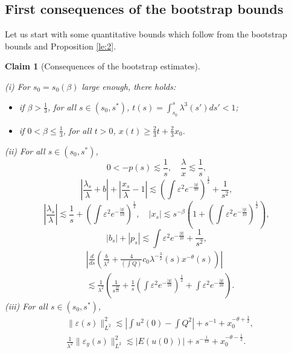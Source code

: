 \documentclass[11pt,a4paper,reqno]{amsart}
\newtheorem{claim}{Claim}
\theoremstyle{remark}
\numberwithin{equation}{section}
\newcommand{\be}{\begin{equation}}
\newcommand{\ee}{\end{equation}}
\def\e{\varepsilon}
\def\lsl{\frac{\lambda_s}{\lambda}}
\def\l{\lambda}
\def\lsl{\frac{\lambda_s}{\lambda}}
\def\xsl{\frac{x_s}{\lambda}}
\begin{document}

\subsection{First consequences of the bootstrap bounds} 


Let us start with some quantitative bounds which follow from the bootstrap bounds and Proposition \ref{le:2}.

\begin{claim}[Consequences of the bootstrap estimates]\label{le:3.1}
 
{\rm (i)} For $s_0=s_0(\beta)$ large enough, there holds:
\begin{itemize}
\item if $\beta>\frac 13$, for all $s\in (s_0,s^*)$, $t(s)= \int_{s_0}^{s} \l^3(s') ds'<1$;
\item if $0<\beta\leq \frac 13$, for all $t>0$, $x(t) \geq \frac 23 t + \frac 23 {x_0}$.
\end{itemize}
{\rm (ii)}
For all $s\in (s_0,s^*)$,
\be\label{BSp}
0< -p(s) \lesssim \frac 1 s,\quad \frac {\l}{x} \lesssim \frac 1 s,
\ee
\be\label{BSlsl}
\left|\lsl +b\right| + \left| \xsl - 1\right| \lesssim
\left(\int \varepsilon^2 {e^{-\frac{|y|}{10}}} \right)^{\frac 12} +  \frac 1{s^2},\ee
\be\label{BSparam}
\left| \lsl \right| \lesssim \frac 1 s + \left(\int \varepsilon^2 {e^{-\frac{|y|}{10}}} \right)^{\frac 12},\quad 
\left| x_s \right|  \lesssim  s^{-\beta}\left( 1+\left(\int \varepsilon^2 {e^{-\frac{|y|}{10}}} \right)^{\frac 12} \right)  ,
\ee
\be\label{BSbsps}
|b_s|+ |p_s| \lesssim   \int \varepsilon^2 {e^{-\frac{|y|}{10}}}    + \frac 1{s^2},
\ee
\begin{align}
& \left| \frac d{ds} \left(\frac b{\l^2} +\frac 4{\left(\int Q\right)}c_0     \l^{-\frac 32}(s) x^{-\theta}(s)\right)   \right| \nonumber \\ &\lesssim  \frac 1{\l^2} 
\left( \frac 1{s^{\frac {29}{10}}}   +  \frac 1 s \left(\int \varepsilon^2 {e^{-\frac{|y|}{10}}} \right)^{\frac 12}
+ \int \varepsilon^2 {e^{-\frac{|y|}{10}}}\right).\label{BSfond}
\end{align}
{\rm (iii)} For all $s\in (s_0,s^*)$,
\begin{align}
&\|\e(s)\|_{L^2}^2 \lesssim \left| \int u^2(0) - \int Q^2\right|+ s^{-1} + x_0^{-\theta+\frac 12},\label{BSeps}\\
& \frac 1{\l^2} \|\e_y(s)\|_{L^2}^2 \lesssim |E(u(0))|+ s^{- \frac 1{10}} + x_0^{-\theta-\frac 12} . 
\end{align}
 \end{claim}
\end{document}
